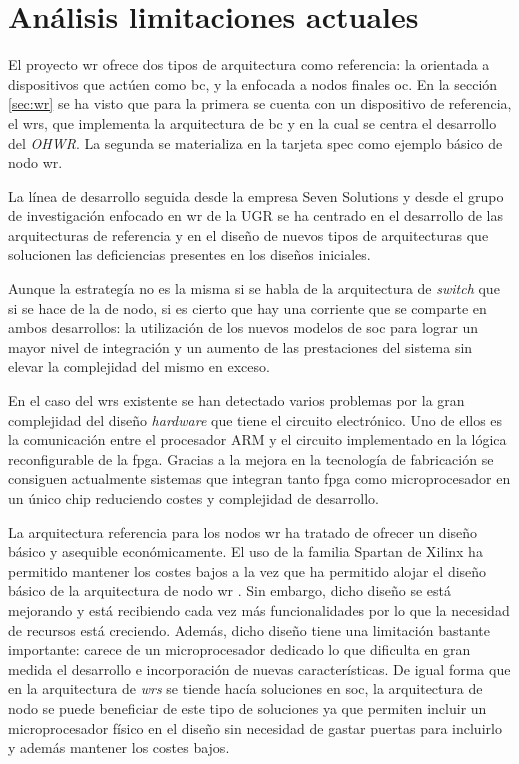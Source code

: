 \chapter{Análisis limitaciones actuales} \label{cap:cadena}

El proyecto \gls{wr} ofrece dos tipos de arquitectura como referencia: la 
orientada a dispositivos que actúen como \gls{bc}, y la enfocada a nodos 
finales \gls{oc}. En la sección \ref{sec:wr} se ha visto que para la primera se 
cuenta con un dispositivo de referencia, el \gls{wrs}, que implementa la 
arquitectura 
de \gls{bc} y en la cual se centra el desarrollo del \textit{OHWR}. La segunda 
se materializa en la tarjeta \gls{spec} como ejemplo básico de nodo \gls{wr}.

La línea de desarrollo seguida desde la empresa Seven Solutions y desde el 
grupo de investigación enfocado en \gls{wr} de la UGR se ha centrado en el 
desarrollo de las arquitecturas de referencia y en el diseño de nuevos tipos de 
arquitecturas que solucionen las deficiencias presentes en los diseños 
iniciales.

Aunque la estrategía no es la misma si se habla de la arquitectura de 
\textit{switch} que si se hace de la de nodo, si es cierto que hay una 
corriente que se comparte en ambos desarrollos: la utilización de los nuevos 
modelos de \gls{soc} para lograr un mayor nivel de integración y un aumento de 
las prestaciones del sistema sin elevar la complejidad del mismo en exceso.

En el caso del \gls{wrs} existente se han detectado varios problemas por la 
gran complejidad del diseño \textit{hardware} que tiene el circuito 
electrónico. 
Uno de ellos es la comunicación entre el procesador ARM y el circuito  
implementado en la lógica reconfigurable de la \gls{fpga}. Gracias a la mejora 
en la 
tecnología de fabricación se consiguen actualmente sistemas que integran tanto 
\gls{fpga} como microprocesador en un único chip reduciendo costes y 
complejidad de desarrollo.

La arquitectura referencia para los nodos \gls{wr} ha tratado de ofrecer un 
diseño básico y asequible económicamente. El uso de la familia Spartan de 
Xilinx ha permitido mantener los costes bajos a la vez que ha permitido alojar 
el diseño básico de la arquitectura de nodo \gls{wr} . Sin embargo, dicho 
diseño se está mejorando y está recibiendo cada vez más funcionalidades por lo 
que la necesidad de recursos está creciendo. Además, dicho diseño tiene una 
limitación bastante importante: carece de un microprocesador dedicado lo que 
dificulta en gran medida el desarrollo e incorporación de nuevas 
características. De igual forma que en la arquitectura de \textit{wrs} se 
tiende hacía soluciones en \gls{soc}, la arquitectura de nodo se puede 
beneficiar de este tipo de soluciones ya que permiten incluir un 
microprocesador físico en el diseño sin necesidad de gastar puertas para 
incluirlo y además mantener los costes bajos.

